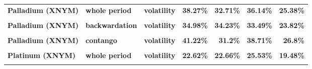 \documentclass[
  authoryear,
  preprint,
  3p]{elsarticle}
\begin{document}
\begin{longtable}[t]{>{}l>{}l>{}l>{}r>{}r>{}r>{}r}
\textbf{Palladium (XNYM)} & \textbf{whole period} & \textbf{volatility} & \textcolor[HTML]{4285f4}{\textbf{38.27\%}} & \textcolor[HTML]{4285f4}{\textbf{32.71\%}} & \textcolor[HTML]{4285f4}{\textbf{36.14\%}} & \textcolor[HTML]{4285f4}{\textbf{25.38\%}}\\
\textbf{\cellcolor{gray!10}{Palladium (XNYM)}} & \textbf{\cellcolor{gray!10}{backwardation}} & \textbf{\cellcolor{gray!10}{mean}} & \textcolor[HTML]{4285f4}{\textbf{\cellcolor{gray!10}{**49.79\%}}} & \textcolor[HTML]{4285f4}{\textbf{\cellcolor{gray!10}{24.47\%}}} & \textcolor[HTML]{4285f4}{\textbf{\cellcolor{gray!10}{30.01\%}}} & \textcolor[HTML]{4285f4}{\textbf{\cellcolor{gray!10}{**31.93\%}}}\\
\textbf{Palladium (XNYM)} & \textbf{backwardation} & \textbf{volatility} & \textcolor[HTML]{4285f4}{\textbf{34.98\%}} & \textcolor[HTML]{4285f4}{\textbf{34.23\%}} & \textcolor[HTML]{4285f4}{\textbf{33.49\%}} & \textcolor[HTML]{4285f4}{\textbf{23.82\%}}\\
\addlinespace
\textbf{\cellcolor{gray!10}{Palladium (XNYM)}} & \textbf{\cellcolor{gray!10}{contango}} & \textbf{\cellcolor{gray!10}{mean}} & \textcolor[HTML]{4285f4}{\textbf{\cellcolor{gray!10}{-30.19\%}}} & \textcolor[HTML]{4285f4}{\textbf{\cellcolor{gray!10}{-6.3\%}}} & \textcolor[HTML]{4285f4}{\textbf{\cellcolor{gray!10}{30.58\%}}} & \textcolor[HTML]{4285f4}{\textbf{\cellcolor{gray!10}{-4.88\%}}}\\
\textbf{Palladium (XNYM)} & \textbf{contango} & \textbf{volatility} & \textcolor[HTML]{4285f4}{\textbf{41.22\%}} & \textcolor[HTML]{4285f4}{\textbf{31.2\%}} & \textcolor[HTML]{4285f4}{\textbf{38.71\%}} & \textcolor[HTML]{4285f4}{\textbf{26.8\%}}\\
\textbf{\cellcolor{gray!10}{Platinum (XNYM)}} & \textbf{\cellcolor{gray!10}{whole period}} & \textbf{\cellcolor{gray!10}{mean}} & \textcolor[HTML]{4285f4}{\textbf{\cellcolor{gray!10}{12.93\%}}} & \textcolor[HTML]{4285f4}{\textbf{\cellcolor{gray!10}{10.56\%}}} & \textcolor[HTML]{4285f4}{\textbf{\cellcolor{gray!10}{7.29\%}}} & \textcolor[HTML]{4285f4}{\textbf{\cellcolor{gray!10}{-7.92\%}}}\\
\textbf{Platinum (XNYM)} & \textbf{whole period} & \textbf{volatility} & \textcolor[HTML]{4285f4}{\textbf{22.62\%}} & \textcolor[HTML]{4285f4}{\textbf{22.66\%}} & \textcolor[HTML]{4285f4}{\textbf{25.53\%}} & \textcolor[HTML]{4285f4}{\textbf{19.48\%}}\\
\textbf{\cellcolor{gray!10}{Platinum (XNYM)}} & \textbf{\cellcolor{gray!10}{backwardation}} & \textbf{\cellcolor{gray!10}{mean}} & \textcolor[HTML]{4285f4}{\textbf{\cellcolor{gray!10}{**29.46\%}}} & \textcolor[HTML]{4285f4}{\textbf{\cellcolor{gray!10}{*25.07\%}}} & \textcolor[HTML]{4285f4}{\textbf{\cellcolor{gray!10}{10.46\%}}} & \textcolor[HTML]{4285f4}{\textbf{\cellcolor{gray!10}{1.17\%}}}\\

\end{longtable}
\end{document}

